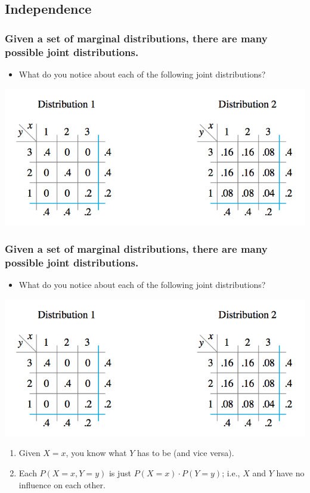 \documentclass[handout]{beamer}\usepackage[]{graphicx}\usepackage[]{color}
\numberwithin{equation}{section}
\begin{document}
\subsection{Independence}

\begin{frame}
\frametitle{\small Given a set of marginal distributions, there are many possible joint distributions.}
\begin{itemize}
\item What do you notice about each of the following joint distributions?
\end{itemize}
 \includegraphics{../../fig/2joint.png}
\end{frame}

\begin{frame}
\frametitle{\small Given a set of marginal distributions, there are many possible joint distributions.} \small
\begin{itemize}
\item What do you notice about each of the following joint distributions?
\end{itemize}
 \includegraphics{../../fig/2joint.png}
\begin{enumerate}[1. ]
\pause \item Given $X = x$, you know what $Y$ has to be (and vice versa). 
\pause \item Each $P(X = x, Y = y)$ is just $P(X = x) \cdot P(Y = y)$; i.e., $X$ and $Y$ have no influence on each other.
\end{enumerate}
\end{frame}
\end{document}
